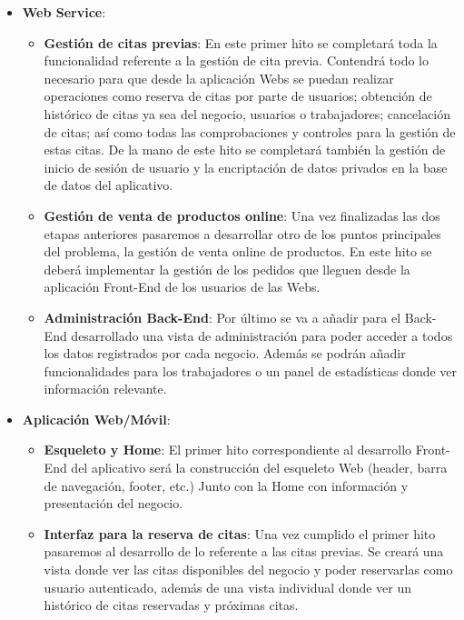 \vspace{0.5em}
\begin{itemize}
    \item \textbf{Web Service}:
        \begin{itemize}
            \item \textbf{Gestión de citas previas}: En este primer hito se completará toda la funcionalidad referente
            a la gestión de cita previa. Contendrá todo lo necesario para que desde la aplicación Webs se puedan
            realizar operaciones como reserva de citas por parte de usuarios; obtención de histórico de citas ya
            sea del negocio, usuarios o trabajadores; cancelación de citas; así como todas las comprobaciones y
            controles para la gestión de estas citas. De la mano de este hito se completará también la gestión
            de inicio de sesión de usuario y la encriptación de datos privados en la base de datos del aplicativo.

            \item \textbf{Gestión de venta de productos online}: Una vez finalizadas las dos etapas anteriores
            pasaremos a desarrollar otro de los puntos principales del problema, la gestión de venta online de
            productos. En este hito se deberá implementar la gestión de los pedidos que lleguen desde la aplicación
            Front-End de los usuarios de las Webs.

            \item \textbf{Administración Back-End}: Por último se va a añadir para el Back-End desarrollado una vista
            de administración para poder acceder a todos los datos registrados por cada negocio. Además se podrán
            añadir funcionalidades para los trabajadores o un panel de estadísticas donde ver información relevante.
        \end{itemize}
    \item \textbf{Aplicación Web/Móvil}:
    \begin{itemize}
                \item \textbf{Esqueleto y Home}: El primer hito correspondiente al desarrollo Front-End del aplicativo
                será la construcción del esqueleto Web (header, barra de navegación, footer, etc.) Junto con la Home
                con información y presentación del negocio.

                \item \textbf{Interfaz para la reserva de citas}: Una vez cumplido el primer hito pasaremos al
                desarrollo de lo referente a las citas previas. Se creará una vista donde ver las citas disponibles del
                negocio y poder reservarlas como usuario autenticado, además de una vista individual donde ver
                un histórico de citas reservadas y próximas citas.


\end{itemize}
\end{itemize}
